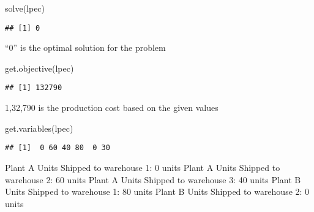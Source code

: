 \documentclass[
]{article}
\newenvironment{Shaded}{\begin{snugshade}}{\end{snugshade}}
\newcommand{\FunctionTok}[1]{\textcolor[rgb]{0.00,0.00,0.00}{#1}}
\newcommand{\NormalTok}[1]{#1}
\begin{document}
\begin{Shaded}
\begin{Highlighting}[]
\FunctionTok{solve}\NormalTok{(lpec)}
\end{Highlighting}
\end{Shaded}

\begin{verbatim}
## [1] 0
\end{verbatim}

``0'' is the optimal solution for the problem

\begin{Shaded}
\begin{Highlighting}[]
\FunctionTok{get.objective}\NormalTok{(lpec)}
\end{Highlighting}
\end{Shaded}

\begin{verbatim}
## [1] 132790
\end{verbatim}

1,32,790 is the production cost based on the given values

\begin{Shaded}
\begin{Highlighting}[]
\FunctionTok{get.variables}\NormalTok{(lpec)}
\end{Highlighting}
\end{Shaded}

\begin{verbatim}
## [1]  0 60 40 80  0 30
\end{verbatim}

Plant A Units Shipped to warehouse 1: 0 units Plant A Units Shipped to
warehouse 2: 60 units Plant A Units Shipped to warehouse 3: 40 units
Plant B Units Shipped to warehouse 1: 80 units Plant B Units Shipped to
warehouse 2: 0 units
\end{document}
